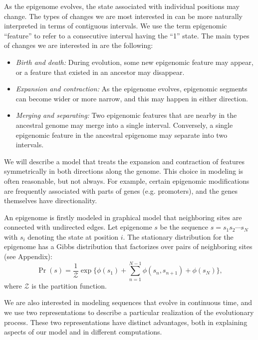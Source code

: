 \documentclass[11pt]{article}
\begin{document}
As the epigenome evolves, the state associated with individual
positions may change. The types of changes we are most interested in
can be more naturally interpreted in terms of contiguous intervals. We
use the term epigenomic ``feature'' to refer to a consecutive interval
having the ``1'' state. The main types of changes we are interested in
are the following:
\begin{itemize}
\item {\it Birth and death:} During evolution, some new epigenomic
  feature may appear, or a feature that existed in an ancestor may
  disappear. %
\item {\it Expansion and contraction:} As the epigenome evolves,
  epigenomic segments can become wider or more narrow, and this may
  happen in either direction.
\item {\it Merging and separating:} Two epigenomic features that are
  nearby in the ancestral genome may merge into a single interval.
  Conversely, a single epigenomic feature in the ancestral epigenome
  may separate into two intervals.
\end{itemize}
We will describe a model that treats the expansion and contraction of
features symmetrically in both directions along the genome.  This
choice in modeling is often reasonable, but not always. For example,
certain epigenomic modifications are frequently associated with parts
of genes (e.g. promoters), and the genes themselves have
directionality.

An epigenome is firstly modeled in graphical model that neighboring
sites are connected with undirected edges.  Let epigenome $s$ be the
sequence $s=s_1s_2\cdots s_N$ with $s_i$ denoting the state at
position $i$.
The stationary distribution for the epigenome has a Gibbs distribution
that factorizes over pairs of neighboring sites (see Appendix):
\begin{equation}\label{eqn:stationary}
  \Pr(s) = \frac{1}{\mathcal{Z}}\exp\big\{\phi(s_1) +\sum_{n=1}^{N-1}\phi(s_n, s_{n+1}) + \phi(s_N)\big\},
\end{equation}
where $\mathcal{Z}$ is the partition function.

We are also interested in modeling sequences that evolve in continuous
time, and we use two representations to describe a particular
realization of the evolutionary process. These two representations
have distinct advantages, both in explaining aspects of our model and
in different computations.
\end{document}
